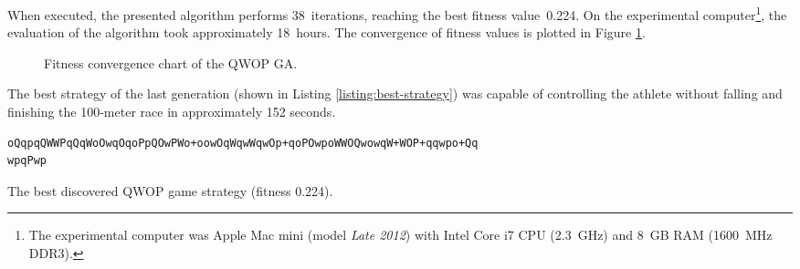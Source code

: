 When executed, the presented algorithm performs 38~iterations, reaching the best fitness value~0.224. On the experimental computer\footnote{The experimental computer was Apple Mac mini (model \textit{Late 2012}) with Intel Core i7 CPU (2.3~GHz) and 8~GB RAM (1600~MHz DDR3).}, the evaluation of the algorithm took approximately 18~hours. The convergence of fitness values is plotted in Figure \ref{fig:qwop-fitness}.

\begin{figure}[ht]
	\centering
	\caption{Fitness convergence chart of the QWOP GA.}
	\label{fig:qwop-fitness}
\end{figure}

The best strategy of the last generation (shown in Listing \ref{listing:best-strategy}) was capable of controlling the athlete without falling and finishing the 100-meter race in approximately 152 seconds.

\begin{listing}[ht]
	\begin{verbatim}
oQqpqQWWPqQqWoOwqOqoPpQOwPWo+oowOqWqwWqwOp+qoPOwpoWWOQwowqW+WOP+qqwpo+Qq
wpqPwp
	\end{verbatim}
	\caption[The best discovered QWOP game strategy.]{The best discovered QWOP game strategy (fitness 0.224).}
	\label{listing:best-strategy}
\end{listing}
